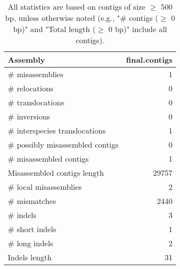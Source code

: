 \documentclass[12pt,a4paper]{article}
\begin{document}
\begin{table}[ht]
\begin{center}
\caption{All statistics are based on contigs of size $\geq$ 500 bp, unless otherwise noted (e.g., "\# contigs ($\geq$ 0 bp)" and "Total length ($\geq$ 0 bp)" include all contigs).}
\begin{tabular}{|l*{1}{|r}|}
\hline
Assembly & final.contigs \\ \hline
\# misassemblies & 1 \\ \hline
\hspace{5mm}\# relocations & 0 \\ \hline
\hspace{5mm}\# translocations & 0 \\ \hline
\hspace{5mm}\# inversions & 0 \\ \hline
\hspace{5mm}\# interspecies translocations & 1 \\ \hline
\# possibly misassembled contigs & 0 \\ \hline
\# misassembled contigs & 1 \\ \hline
Misassembled contigs length & 29757 \\ \hline
\# local misassemblies & 2 \\ \hline
\# mismatches & 2440 \\ \hline
\# indels & 3 \\ \hline
\hspace{5mm}\# short indels & 1 \\ \hline
\hspace{5mm}\# long indels & 2 \\ \hline
Indels length & 31 \\ \hline
\end{tabular}
\end{center}
\end{table}
\end{document}
